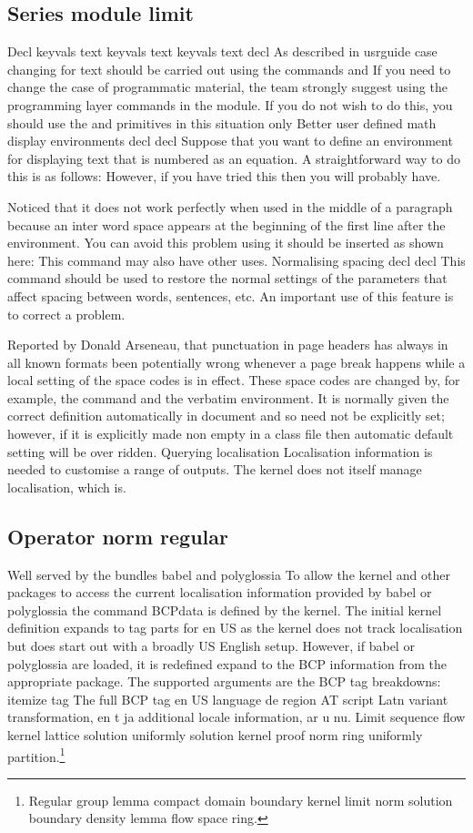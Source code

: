 \documentclass{article}
\begin{document}
\subsection{Series module limit}
Decl keyvals text keyvals text keyvals text decl As described in usrguide case changing for text should be carried out using the commands and If you need to change the case of programmatic material, the team strongly suggest using the programming layer commands in the module. If you do not wish to do this, you should use the and primitives in this situation only Better user defined math display environments decl decl Suppose that you want to define an environment for displaying text that is numbered as an equation. A straightforward way to do this is as follows: However, if you have tried this then you will probably have.

Noticed that it does not work perfectly when used in the middle of a paragraph because an inter word space appears at the beginning of the first line after the environment. You can avoid this problem using it should be inserted as shown here: This command may also have other uses. Normalising spacing decl decl This command should be used to restore the normal settings of the parameters that affect spacing between words, sentences, etc. An important use of this feature is to correct a problem.

Reported by Donald Arseneau, that punctuation in page headers has always in all known formats been potentially wrong whenever a page break happens while a local setting of the space codes is in effect. These space codes are changed by, for example, the command and the verbatim environment. It is normally given the correct definition automatically in document and so need not be explicitly set; however, if it is explicitly made non empty in a class file then automatic default setting will be over ridden. Querying localisation Localisation information is needed to customise a range of outputs. The kernel does not itself manage localisation, which is.

\subsection{Operator norm regular}
Well served by the bundles babel and polyglossia To allow the kernel and other packages to access the current localisation information provided by babel or polyglossia the command BCPdata is defined by the kernel. The initial kernel definition expands to tag parts for en US as the kernel does not track localisation but does start out with a broadly US English setup. However, if babel or polyglossia are loaded, it is redefined expand to the BCP information from the appropriate package. The supported arguments are the BCP tag breakdowns: itemize tag The full BCP tag en US language de region AT script Latn variant transformation, en t ja additional locale information, ar u nu.
Limit sequence flow kernel lattice solution uniformly solution kernel proof norm ring uniformly partition.\footnote{Regular group lemma compact domain boundary kernel limit norm solution boundary density lemma flow space ring.}
\end{document}
